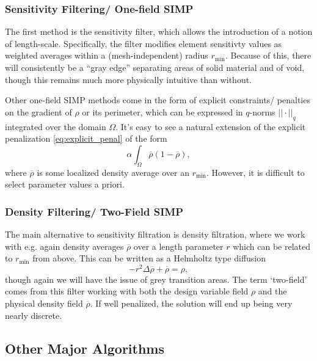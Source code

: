 \subsubsection{Sensitivity Filtering/ One-field SIMP}

The first method is the sensitivity filter, which allows the introduction of a notion of length-scale. Specifically,
the filter modifies element sensitivty values as weighted averages within a (mesh-independent) radius $r_{\text{min}}$. Because
of this, there will consistently be a ``gray edge'' separating areas of solid material and of void, though this
remains much more physically intuitive than without.

Other one-field SIMP methods come in the form of explicit constraints/ penalties on the gradient of $\rho$ or its perimeter,
which can be expressed in $q$-norms $||\cdot||_q$ integrated over the domain $\Omega$. It's easy to see a natural extension
of the explicit penalization \autoref{eq:explicit_penal} of the form
\begin{equation}
    \alpha \int_\Omega \overline{\rho} (1- \overline{\rho}),
\end{equation}
where $\overline{\rho}$ is some localized density average over an $r_\text{min}$. However, it is difficult to select
parameter values a priori.

\subsubsection{Density Filtering/ Two-Field SIMP}

The main alternative to sensitivity filtration is density filtration, where we work with e.g. again density averages
$\overline{\rho}$ over a length parameter $r$ which can be related to $r_\text{min}$ from above. This can be written
as a Helmholtz type diffusion
\begin{equation}
    -r^2 \Delta \overline{\rho} + \overline{\rho} = \rho,
\end{equation}
though again we will have the issue of grey transition areas. The term `two-field' comes from this filter working with both
the design variable field $\rho$ and the physical density field $\overline{\rho}$. If well penalized, the solution
will end up being very nearly discrete.

\subsection{Other Major Algorithms}

